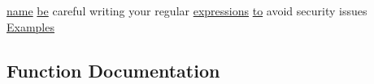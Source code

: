 \begin{DoxyCompactItemize}
\hyperlink{pcre_8txt_a5a15d68aadb41c771fe50a27c400d49b}{name} \hyperlink{NON-AUTOTOOLS-BUILD_8txt_ac08ce70cbd4f453457597ad15ecbebdd}{be} careful writing your regular \hyperlink{perltest_8txt_a7df68229a6e0e55982138713459bcfb2}{expressions} \hyperlink{pcretest_8txt_aa22c98f630e4b3fe86ee17ce5150c62f}{to} avoid security issues \hyperlink{basic-configuration_8txt_aabaffd9e6ab07e022cdc7830519640e6}{Examples}
\end{DoxyCompactItemize}


\subsection{Function Documentation}

